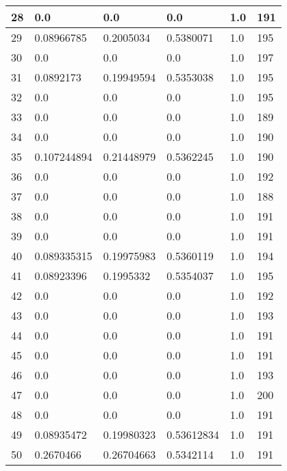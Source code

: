 \begin{longtable}{|l|l|l|l|l|l|}
28 & 0.0 & 0.0 & 0.0 & 1.0 & 191 \\ \hline 
29 & 0.08966785 & 0.2005034 & 0.5380071 & 1.0 & 195 \\ \hline 
30 & 0.0 & 0.0 & 0.0 & 1.0 & 197 \\ \hline 
31 & 0.0892173 & 0.19949594 & 0.5353038 & 1.0 & 195 \\ \hline 
32 & 0.0 & 0.0 & 0.0 & 1.0 & 195 \\ \hline 
33 & 0.0 & 0.0 & 0.0 & 1.0 & 189 \\ \hline 
34 & 0.0 & 0.0 & 0.0 & 1.0 & 190 \\ \hline 
35 & 0.107244894 & 0.21448979 & 0.5362245 & 1.0 & 190 \\ \hline 
36 & 0.0 & 0.0 & 0.0 & 1.0 & 192 \\ \hline 
37 & 0.0 & 0.0 & 0.0 & 1.0 & 188 \\ \hline 
38 & 0.0 & 0.0 & 0.0 & 1.0 & 191 \\ \hline 
39 & 0.0 & 0.0 & 0.0 & 1.0 & 191 \\ \hline 
40 & 0.089335315 & 0.19975983 & 0.5360119 & 1.0 & 194 \\ \hline 
41 & 0.08923396 & 0.1995332 & 0.5354037 & 1.0 & 195 \\ \hline 
42 & 0.0 & 0.0 & 0.0 & 1.0 & 192 \\ \hline 
43 & 0.0 & 0.0 & 0.0 & 1.0 & 193 \\ \hline 
44 & 0.0 & 0.0 & 0.0 & 1.0 & 191 \\ \hline 
45 & 0.0 & 0.0 & 0.0 & 1.0 & 191 \\ \hline 
46 & 0.0 & 0.0 & 0.0 & 1.0 & 193 \\ \hline 
47 & 0.0 & 0.0 & 0.0 & 1.0 & 200 \\ \hline 
48 & 0.0 & 0.0 & 0.0 & 1.0 & 191 \\ \hline 
49 & 0.08935472 & 0.19980323 & 0.53612834 & 1.0 & 191 \\ \hline 
50 & 0.2670466 & 0.26704663 & 0.5342114 & 1.0 & 191 \\ \hline 
\end{longtable}